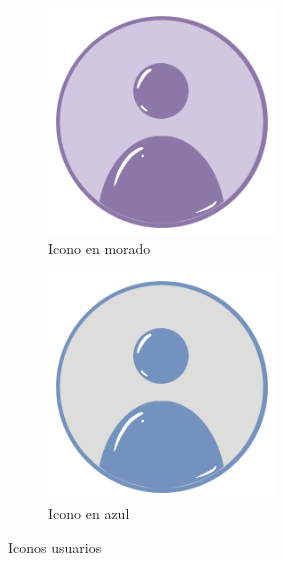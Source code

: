 \documentclass[a4paper, 12pt]{article}
\begin{document}
\begin{figure}[H]
   	\begin{subfigure}{0.48\textwidth}
		\begin{center}
			{\includegraphics[width=6cm]{logo/ALLUSER.png}\par}
			\caption{Icono en morado}
		\end{center}  
	\end{subfigure}\hfill
   	\begin{subfigure}{0.48\textwidth}
		\begin{center}
			{\includegraphics[width=6cm]{logo/USER.png}\par}
			\caption{Icono en azul}
		\end{center}  
	\end{subfigure}\hfill
	\caption{Iconos usuarios}
\end{figure}
\end{document}
